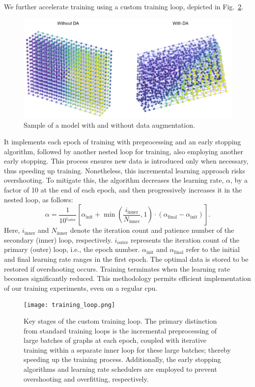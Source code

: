 \documentclass[12pt,a4paper]{report}
\begin{document}
We further accelerate training using a custom training loop, depicted in Fig.~\ref{fig:training_loop}.
%
\begin{figure}\centering
\includegraphics[width=0.8\linewidth,keepaspectratio]{da_sample.jpg}
\caption{Sample of a model with and without data augmentation.}\label{fig:da_sample}
\end{figure}
%
It implements each epoch of training with preprocessing and an early stopping algorithm, followed by another nested loop for training, also employing another early stopping. This process ensures new data is introduced only when necessary, thus speeding up training. Nonetheless, this incremental learning approach risks overshooting. To mitigate this, the algorithm decreases the learning rate, \( \alpha \), by a factor of 10 at the end of each epoch, and then progressively increases it in the nested loop, as follows:
%
\begin{equation}
    \alpha = \frac{1}{10^{i_{\text{outer}}}} \left[
    \alpha_{\text{init}} + \min\left(\frac{i_{\text{inner}}}{N_{\text{inner}}}, 1\right) \cdot (\alpha_{\text{final}} - \alpha_{\text{init}})
    \right].
\end{equation}
%
Here, \( i_{\text{inner}} \) and \( N_{\text{inner}} \) denote the iteration count and patience number of the secondary (inner) loop, respectively. \( i_{\text{outer}} \) represents the iteration count of the primary (outer) loop, i.e., the epoch number. \( \alpha_{\text{init}} \) and \( \alpha_{\text{final}} \) refer to the initial and final learning rate ranges in the first epoch. The optimal data is stored to be restored if overshooting occurs. Training terminates when the learning rate becomes significantly reduced. This methodology permits efficient implementation of our training experiments, even on a regular \ac{cpu}.
%
\begin{figure}\centering
\texttt{[image: training\_loop.png]}
\caption{Key stages of the custom training loop. The primary distinction from standard training loops is the incremental preprocessing of large batches of graphs at each epoch, coupled with iterative training within a separate inner loop for these large batches; thereby speeding up the training process. Additionally, the early stopping algorithms and learning rate schedulers are employed to prevent overshooting and overfitting, respectively.}\label{fig:training_loop}
\end{figure}
\end{document}
